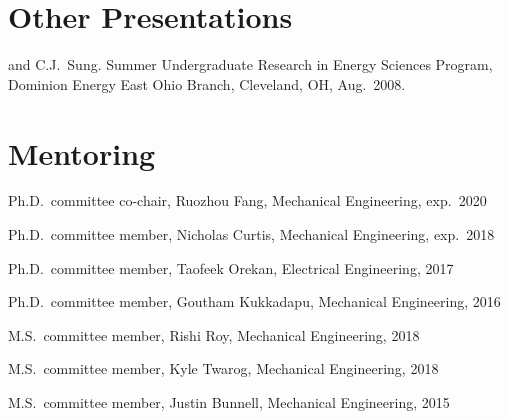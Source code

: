 \section{{\sectionfont Other Presentations}}

\begin{bibmune}
\item {} and C.J.\ Sung.  Summer Undergraduate Research in Energy Sciences Program,
        Dominion Energy East Ohio Branch, Cleveland, OH, Aug.\ 2008.\\
\end{bibmune}

\vspace{\baselineskip}

\section{\sectionfont{} Mentoring}

\begin{lonelist}
\item Ph.D.\ committee co-chair, Ruozhou Fang, Mechanical Engineering, exp.\ 2020
\item Ph.D.\ committee member, Nicholas Curtis, Mechanical Engineering, exp.\ 2018
\item Ph.D.\ committee member, Taofeek Orekan, Electrical Engineering, 2017
\item Ph.D.\ committee member, Goutham Kukkadapu, Mechanical Engineering, 2016
\item M.S.\ committee member, Rishi Roy, Mechanical Engineering, 2018
\item M.S.\ committee member, Kyle Twarog, Mechanical Engineering, 2018
\item M.S.\ committee member, Justin Bunnell, Mechanical Engineering, 2015
\end{lonelist}







